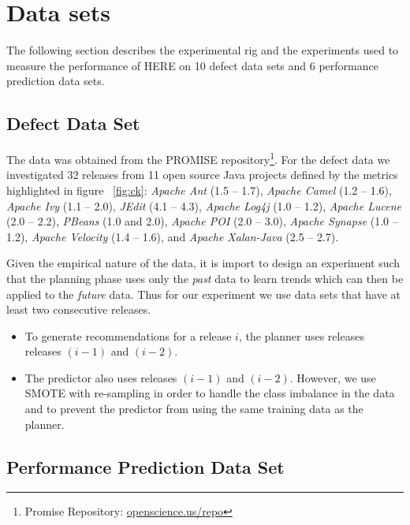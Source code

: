 \documentclass[conference]{IEEEtran}
\newcommand{\kw}[1]{\textit{#1}}
\begin{document}
\section{Data sets}

The following section describes the experimental rig and the experiments used to measure the performance of HERE on 10 defect data sets and 6 performance prediction data sets.

\subsection{Defect Data Set}
The data was obtained from the PROMISE repository\footnote{Promise Repository: \url{openscience.us/repo}}. For the defect data we investigated 32 releases from 11 open source Java projects defined by the metrics highlighted in figure ~\ref{fig:ck}: \kw{Apache Ant} (1.5 -- 1.7), \kw{Apache Camel} (1.2 -- 1.6), \kw{Apache Ivy} (1.1 -- 2.0), \kw{JEdit} (4.1 -- 4.3), \kw{Apache Log4j} (1.0 -- 1.2), \kw{Apache Lucene} (2.0 -- 2.2), \kw{PBeans} (1.0 and 2.0), \kw{Apache POI} (2.0 -- 3.0), \kw{Apache Synapse} (1.0 -- 1.2), \kw{Apache Velocity} (1.4 -- 1.6), and \kw{Apache Xalan-Java} (2.5 -- 2.7). 

Given the empirical nature of the data, it is import to design an experiment such that the planning phase uses only the \kw{past} data to learn trends which can then be applied to the \kw{future} data. Thus for our experiment we use data sets that have at least two consecutive releases. 
\begin{itemize}
\item To generate recommendations for a release $i$, the planner uses releases releases $(i-1)$ and $(i-2)$.
\item The predictor also uses releases $(i-1)$ and $(i-2)$. However, we use SMOTE with re-sampling in order to handle the class imbalance in the data and to prevent the predictor from using the same training data as the planner.
\end{itemize}

\subsection{Performance Prediction Data Set}
\end{document}
